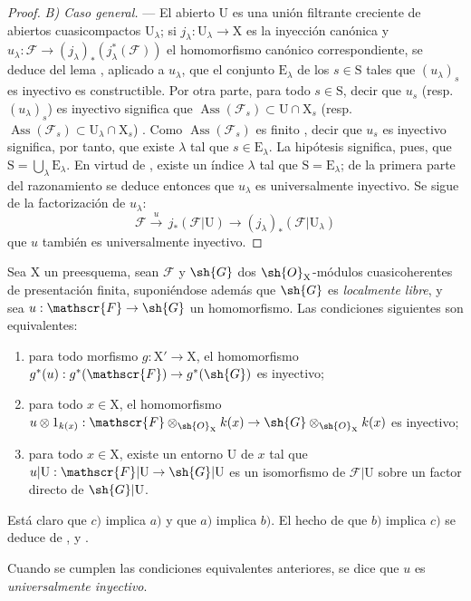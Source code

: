 \begin{proof}
\emph{B) Caso general.} --- El abierto $\mathrm{U}$ es una unión filtrante creciente de abiertos cuasicompactos $\mathrm{U}_\lambda$; si $j_\lambda:\mathrm{U}_\lambda\to\mathrm{X}$ es la inyección canónica y $u_\lambda:\mathscr{F}\to(j_\lambda)_*(j_\lambda^*(\mathscr{F}))$ el homomorfismo canónico correspondiente, se deduce del lema , aplicado a $u_\lambda$, que el conjunto $\mathrm{E}_\lambda$ de los $s\in\mathrm{S}$ tales que $(u_\lambda)_s$ es inyectivo es constructible.
Por otra parte, para todo $s\in\mathrm{S}$, decir que $u_s$ (resp.\ $(u_\lambda)_s$) es inyectivo significa que $\operatorname{Ass}(\mathscr{F}_s)\subset\mathrm{U}\cap\mathrm{X}_s$ (resp.\ $\operatorname{Ass}(\mathscr{F}_s)\subset\mathrm{U}_\lambda\cap\mathrm{X}_s$) .
Como $\operatorname{Ass}(\mathscr{F}_s)$ es finito , decir que $u_s$ es inyectivo significa, por tanto, que existe $\lambda$ tal que $s\in\mathrm{E}_\lambda$.
La hipótesis significa, pues, que $\mathrm{S}=\bigcup_\lambda\mathrm{E}_\lambda$.
En virtud de , existe un índice $\lambda$ tal que $\mathrm{S}=\mathrm{E}_\lambda$; de la primera parte del razonamiento se deduce entonces que $u_\lambda$ es universalmente inyectivo.
Se sigue de la factorización de $u_\lambda$:
\[
  \mathscr{F}\xrightarrow{u}\,j_*(\mathscr{F}|\mathrm{U})\to(j_\lambda)_*(\mathscr{F}|\mathrm{U}_\lambda)
\]
que $u$ también es universalmente inyectivo.
\end{proof}

\begin{remarks}[11.9.18]
\label{IV.11.9.18}
Sea $\mathrm{X}$ un preesquema, sean $\mathscr{F}$ y $\sh{G}$ dos $\sh{O}_\mathrm{X}$-módulos cuasicoherentes de presentación finita, suponiéndose además que $\sh{G}$ es \emph{localmente libre}, y sea $u:\mathscr{F}\to\sh{G}$ un homomorfismo.
Las condiciones siguientes son equivalentes:
\begin{enumerate}[label=\emph{\alph*)}]
  \item para todo morfismo $g:\mathrm{X}'\to\mathrm{X}$, el homomorfismo $g^*(u):g^*(\mathscr{F})\to g^*(\sh{G})$ es inyectivo;
  \item para todo $x\in\mathrm{X}$, el homomorfismo $u\otimes 1_{k(x)}:\mathscr{F}\otimes_{\sh{O}_{\mathrm{X}}}k(x)\to\sh{G}\otimes_{\sh{O}_\mathrm{X}}k(x)$ es inyectivo;
  \item para todo $x\in\mathrm{X}$, existe un entorno $\mathrm{U}$ de $x$ tal que $u|\mathrm{U}:\mathscr{F}|\mathrm{U}\to\sh{G}|\mathrm{U}$ es un isomorfismo de $\mathscr{F}|\mathrm{U}$ sobre un factor directo de $\sh{G}|\mathrm{U}$.
\end{enumerate}

Está claro que $c)$ implica $a)$ y que $a)$ implica $b)$.
El hecho de que $b)$ implica $c)$ se deduce de ,  y .

Cuando se cumplen las condiciones equivalentes anteriores, se dice que $u$ es \emph{universalmente inyectivo}.
\end{remarks}

